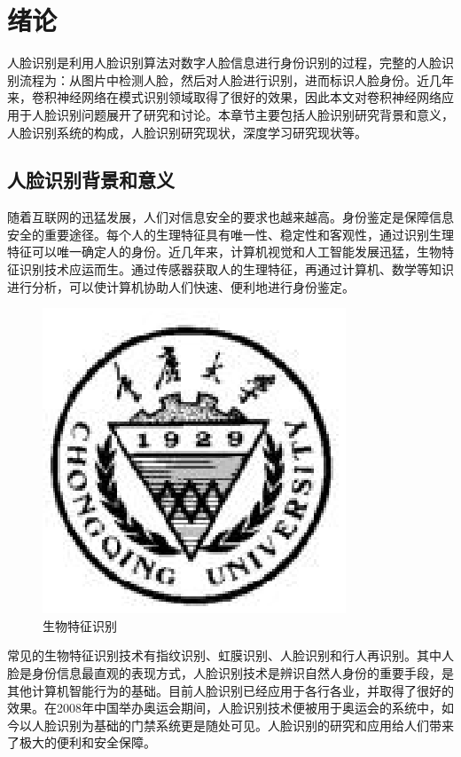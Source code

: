 \documentclass[bachelor,zhspacing]{cqu}  %
\begin{document}


\section{绪论}\label{ux7eeaux8bba}

人脸识别是利用人脸识别算法对数字人脸信息进行身份识别的过程，完整的人脸识别流程为：从图片中检测人脸，然后对人脸进行识别，进而标识人脸身份。近几年来，卷积神经网络在模式识别领域取得了很好的效果，因此本文对卷积神经网络应用于人脸识别问题展开了研究和讨论。本章节主要包括人脸识别研究背景和意义，人脸识别系统的构成，人脸识别研究现状，深度学习研究现状等。

\subsection{人脸识别背景和意义}\label{ux4ebaux8138ux8bc6ux522bux80ccux666fux548cux610fux4e49}

随着互联网的迅猛发展，人们对信息安全的要求也越来越高。身份鉴定是保障信息安全的重要途径。每个人的生理特征具有唯一性、稳定性和客观性，通过识别生理特征可以唯一确定人的身份。近几年来，计算机视觉和人工智能发展迅猛，生物特征识别技术应运而生。通过传感器获取人的生理特征，再通过计算机、数学等知识进行分析，可以使计算机协助人们快速、便利地进行身份鉴定。

\begin{figure}[htbp]
\centering
\includegraphics{./pic/cqu.eps}
\caption{生物特征识别}\label{fig:}
\end{figure}

常见的生物特征识别技术有指纹识别、虹膜识别、人脸识别和行人再识别。其中人脸是身份信息最直观的表现方式，人脸识别技术是辨识自然人身份的重要手段，是其他计算机智能行为的基础。目前人脸识别已经应用于各行各业，并取得了很好的效果。在2008年中国举办奥运会期间，人脸识别技术便被用于奥运会的系统中，如今以人脸识别为基础的门禁系统更是随处可见。人脸识别的研究和应用给人们带来了极大的便利和安全保障。
\end{document}
